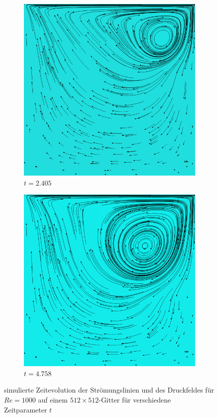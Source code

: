 \begin{figure}[!htb]
			\begin{subfigure}[b]{.5\textwidth}
				\includegraphics[scale = 0.28]{screenshots/re-1000-512-02405.png}
				\caption{$t=2.405$}
			\end{subfigure}%
			\begin{subfigure}[b]{.5\textwidth}
				\includegraphics[scale = 0.28]{screenshots/re-1000-512-04758.png}
				\caption{$t=4.758$}
			\end{subfigure}
			\caption{simulierte Zeitevolution der Strömungslinien und des Druckfeldes für $Re=1000$ auf einem $512\times 512$-Gitter für verschiedene Zeitparameter $t$}
			\label{fig:time re 1000 1}
		\end{figure}

